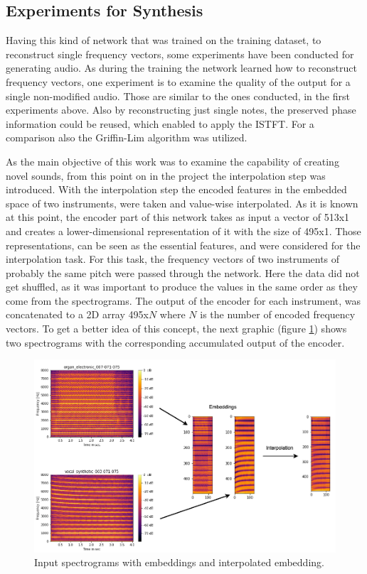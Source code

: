 \subsection{Experiments for Synthesis}
Having this kind of network that was trained on the training dataset, to reconstruct single frequency vectors, some experiments have been conducted for generating audio. As during the training the network learned how to reconstruct frequency vectors, one experiment is to examine the quality of the output for a single non-modified audio. Those are similar to the ones conducted, in the first experiments above. Also by reconstructing just single notes, the preserved phase information could be reused, which enabled to apply the ISTFT. For a comparison also the Griffin-Lim algorithm was utilized.

As the main objective of this work was to examine the capability of creating novel sounds, from this point on in the project the interpolation step was introduced. With the interpolation step the encoded features in the embedded space of two instruments, were taken and value-wise interpolated. As it is known at this point, the encoder part of this network takes as input a vector of 513x1 and creates a lower-dimensional representation of it with the size of 495x1. Those representations, can be seen as the essential features, and were considered for the interpolation task. For this task, the frequency vectors of two instruments of probably the same pitch were passed through the network. Here the data did not get shuffled, as it was important to produce the values in the same order as they come from the spectrograms. The output of the encoder for each instrument, was concatenated to a 2D array 495x$N$ where $N$ is the number of encoded frequency vectors. To get a better idea of this concept, the next graphic (figure \ref{fig:exp_spec_emb_int_1D}) shows two spectrograms with the corresponding accumulated output of the encoder.\\ 

 \begin{figure}[htb!]
	\caption{Input spectrograms with embeddings and interpolated embedding.}
	\label{fig:exp_spec_emb_int_1D}
	\centering
	\includegraphics[width=\textwidth]{images/experiments/spec_to_emb.png}
\end{figure}


